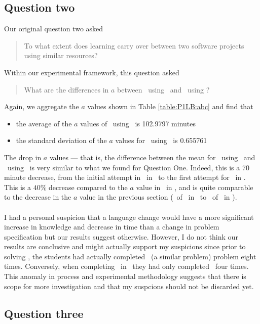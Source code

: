 \subsection{Question two}

Our original question two asked
\begin{quote}
  To what extent does learning carry over between two software projects using
  similar resources?
\end{quote}

Within our experimental framework, this question asked
\begin{quote}
   What are the differences in $a$ between \PO\ using \LA\ and \PO\ using
  \LB?
\end{quote}

Again, we aggregate the $a$ values shown in Table \ref{table:P1LB:abc} and find
that
\begin{itemize}
  \item the average of the $a$ values of \PO\ using \LB\ is 102.9797 minutes
  \item the standard deviation of the $a$ values for \PO\ using \LB\ is 0.655761
\end{itemize}

The drop in $a$ values --- that is, the difference between the mean for \PO\
using \LA\ and \PO\ using \LB\ is very similar to what we found for Question
One.
Indeed, this is a 70 minute decrease, from the initial attempt in \PO\ in \LA\
to the first attempt for \PO\ in \LB.
This is a $40\%$ decrease compared to the $a$ value in \PO\ in \LA, and is quite
comparable to the decrease in the $a$ value in the previous section (\AZ\ of
\PO\ in \LA\ to \AZ\ of \PT\ in \LA).\\
\\
I had a personal suspicion that a language change would have a more significant
increase in knowledge and decrease in time than a change in problem
specification but our results suggest otherwise.
However, I do not think our results are conclusive and might actually support my
suspicions since prior to solving \PT, the students had actually completed \PO\
(a similar problem) problem eight times.
Conversely, when completing \PO\ in \LB\ they had only completed \PO\ four times.
This anomaly in process and experimental methodology suggests that
there is scope for more investigation and that my suspcions should not be
discarded yet.

\subsection{Question three}

